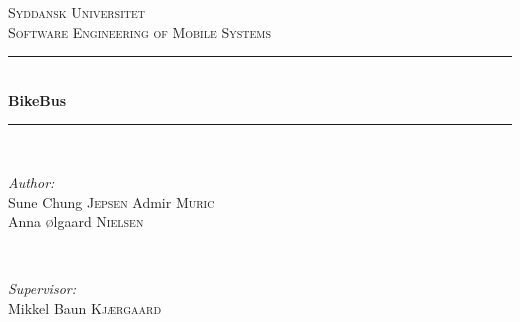 \documentclass[a4paper]{report}
\theoremstyle{plain}
\begin{document}
\begin{titlepage}

\newcommand{\HRule}{\rule{\linewidth}{0.5mm}} %

\center %
 

\textsc{\LARGE Syddansk Universitet}\\[0.5cm] %
\textsc{\large Software Engineering of Mobile Systems}\\[1.5cm] %



\HRule \\[0.4cm]
{ \huge \bfseries BikeBus}\\[0.4cm] %
\HRule \\[1.5cm]
 

\begin{minipage}{0.4\textwidth}
\begin{flushleft} \large
\emph{Author:}\\
Sune Chung \textsc{Jepsen} %
Admir \textsc{Muric}\\ %
Anna \textsc{\o}lgaard \textsc{Nielsen} %
\end{flushleft}
\end{minipage}
~
\begin{minipage}{0.4\textwidth}
\begin{flushright} \large
\emph{Supervisor:} \\
Mikkel Baun \textsc{Kjærgaard} %
\end{flushright}
\end{minipage}\\[2cm]


\end{titlepage}
\end{document}
